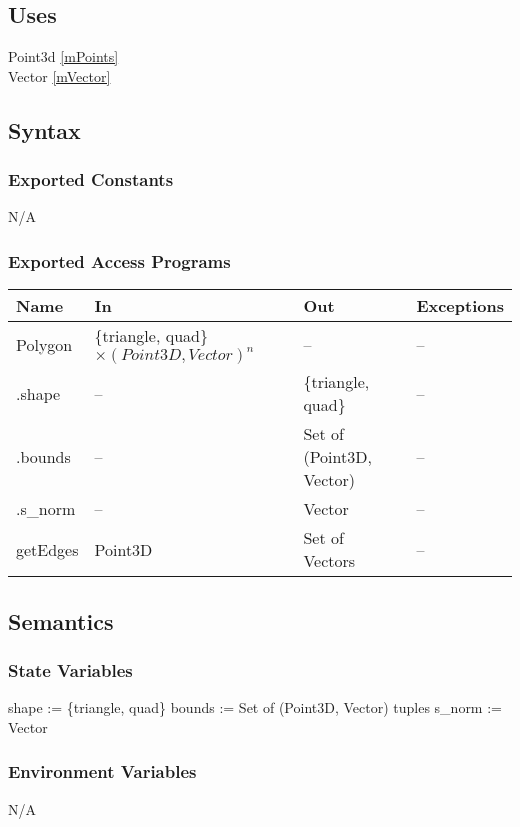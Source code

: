 \documentclass[12pt, titlepage]{article}
\begin{document}
\subsection{Uses}
Point3d \ref{mPoints} \\
Vector \ref{mVector}\\

\subsection{Syntax}
\subsubsection{Exported Constants}
N/A
\subsubsection{Exported Access Programs}
\begin{center}
	\begin{tabular}{p{4cm} p{2cm} p{2cm} p{4cm}}
		\hline
		\textbf{Name} & \textbf{In} & \textbf{Out} & \textbf{Exceptions} \\
		\hline
		Polygon & \{triangle, quad\} $\times (Point3D, Vector)^n$ & -- & -- \\
		.shape & -- & \{triangle, quad\} & -- \\
		.bounds & -- & Set of (Point3D, Vector) & -- \\
		.s\_norm & -- & Vector & -- \\
		getEdges & Point3D & Set of Vectors & -- \\
		\hline
	\end{tabular}
\end{center}

\subsection{Semantics}
\subsubsection{State Variables}
shape := \{triangle, quad\}
bounds := Set of (Point3D, Vector) tuples
s\_norm := Vector

\subsubsection{Environment Variables}
N/A
\end{document}
